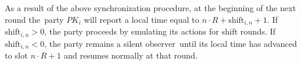 As a result of the above synchronization procedure, at the beginning of the next round the\
party $PK_i$ will report a local time equal to $n \cdot R + \text{shift}_{i, n} + 1$.
If ${\text{shift}_{i, n} > 0}$, the party proceeds by emulating its actions for shift rounds.
If ${\text{shift}_{i, n} < 0}$, the party remains a silent observer\
until its local time has advanced to slot $n \cdot R + 1$ and resumes normally at that round.